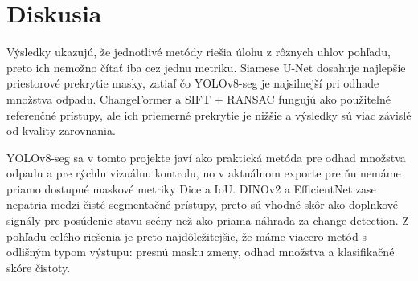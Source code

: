 \documentclass[conference]{IEEEtran}
\begin{document}
\begin{table}[!t]
\centering
\caption{Priemerné metriky na 13 pároch s maskami. Znak ``—'' znamená, že daná metrika nebola pre metódu v tomto exporte dostupná.}
\label{tab:mask_metrics}
\end{table}

\section{Diskusia}
Výsledky ukazujú, že jednotlivé metódy riešia úlohu z rôznych uhlov pohľadu, preto ich nemožno čítať iba cez jednu metriku. Siamese U-Net dosahuje najlepšie priestorové prekrytie masky, zatiaľ čo YOLOv8-seg je najsilnejší pri odhade množstva odpadu. ChangeFormer a SIFT + RANSAC fungujú ako použiteľné referenčné prístupy, ale ich priemerné prekrytie je nižšie a výsledky sú viac závislé od kvality zarovnania.

YOLOv8-seg sa v tomto projekte javí ako praktická metóda pre odhad množstva odpadu a pre rýchlu vizuálnu kontrolu, no v aktuálnom exporte pre ňu nemáme priamo dostupné maskové metriky Dice a IoU. DINOv2 a EfficientNet zase nepatria medzi čisté segmentačné prístupy, preto sú vhodné skôr ako doplnkové signály pre posúdenie stavu scény než ako priama náhrada za change detection. Z pohľadu celého riešenia je preto najdôležitejšie, že máme viacero metód s odlišným typom výstupu: presnú masku zmeny, odhad množstva a klasifikačné skóre čistoty.
\end{document}
